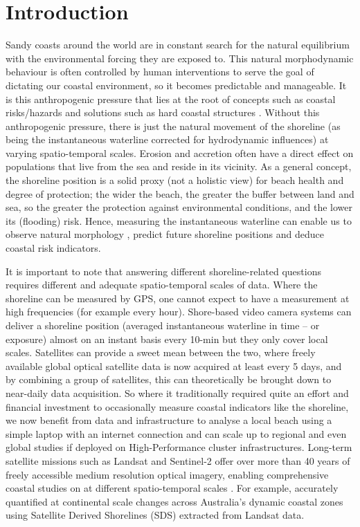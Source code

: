 \documentclass[remotesensing,technicalnote,submit,pdftex,moreauthors]{Definitions/mdpi}
\begin{document}
\section{Introduction}
Sandy coasts around the world are in constant search for the natural equilibrium with the environmental forcing they are exposed to. This natural morphodynamic behaviour is often controlled by human interventions to serve the goal of dictating our coastal environment, so it becomes predictable and manageable. It is this anthropogenic pressure that lies at the root of concepts such as coastal risks/hazards and solutions such as hard coastal structures \citep{Rashidi:2021}. Without this anthropogenic pressure, there is just the natural movement of the shoreline (as being the instantaneous waterline corrected for hydrodynamic influences) at varying spatio-temporal scales. Erosion and accretion often have a direct effect on populations that live from the sea and reside in its vicinity. As a general concept, the shoreline position is a solid proxy (not a holistic view) for beach health and degree of protection; the wider the beach, the greater the buffer between land and sea, so the greater the protection against environmental conditions, and the lower its (flooding) risk. Hence, measuring the instantaneous waterline can enable us to observe natural morphology \citep{Vitousek:17b}, predict future shoreline positions \citep{vitousek:23} and deduce coastal risk indicators.

It is important to note that answering different shoreline-related questions requires different and adequate spatio-temporal scales of data\cite{bergsma2022wave}. Where the shoreline can be measured by GPS, one cannot expect to have a measurement at high frequencies (for example every hour). Shore-based video camera systems can deliver a shoreline position (averaged instantaneous waterline in time -- or exposure) almost on an instant basis every 10-min but they only cover local scales. Satellites can provide a sweet mean between the two, where freely available global optical satellite data is now acquired at least every 5 days, and by combining a group of satellites, this can theoretically be brought down to near-daily data acquisition. So where it traditionally required quite an effort and financial investment to occasionally measure coastal indicators like the shoreline, we now benefit from data and infrastructure to analyse a local beach using a simple laptop with an internet connection and can scale up to regional and even global studies if deployed on High-Performance cluster infrastructures. Long-term satellite missions such as Landsat and Sentinel-2 offer over more than 40 years of freely accessible medium resolution optical imagery, enabling comprehensive coastal studies on at different spatio-temporal scales \citep{Apostolopoulos:2021}. For example, \citep{BISHOPTAYLOR:2021} accurately quantified at continental scale changes across Australia's dynamic coastal zones using Satellite Derived Shorelines (SDS) extracted from Landsat data.
\end{document}
